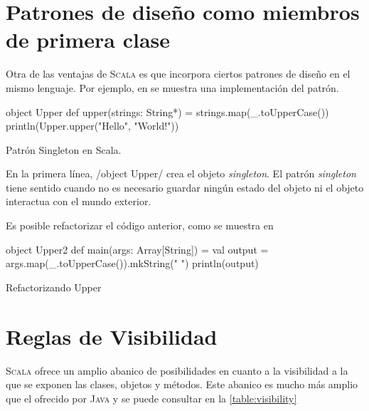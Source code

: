 \section{Patrones de diseño como miembros de primera clase}
\label{sec:patterns}

Otra de las ventajas de \textsc{Scala} es que incorpora ciertos patrones de
diseño en el mismo lenguaje. Por ejemplo, en  se muestra una
implementación del patrón.

\begin{listing}[H]
  \begin{scalacode}
    object Upper {
      def upper(strings: String*) = strings.map(_.toUpperCase())
    }
    println(Upper.upper("Hello", "World!"))
  \end{scalacode}
  \caption{Patrón Singleton en Scala.}
  \label{lst:object}
\end{listing}

En la primera línea, \scalainline/object Upper/ crea el objeto
\emph{singleton}. El patrón \emph{singleton} tiene sentido cuando no es
necesario guardar ningún estado del objeto ni el objeto interactua con el mundo
exterior.

Es posible refactorizar el código anterior, como se muestra en

\begin{listing}[H]
  \begin{scalacode}
    object Upper2 {
      def main(args: Array[String]) = {
        val output = args.map(_.toUpperCase()).mkString(" ")
        println(output)
      }
    }
  \end{scalacode}
  \caption{Refactorizando Upper}
  \label{lst:object2}
\end{listing}

\section{Reglas de Visibilidad}
\label{sec:visibility}

\textsc{Scala} ofrece un amplio abanico de posibilidades en cuanto a la
visibilidad a la que se exponen las clases, objetos y métodos. Este abanico es
mucho más amplio que el ofrecido por \textsc{Java} y se puede consultar en la
\autoref{table:visibility}

